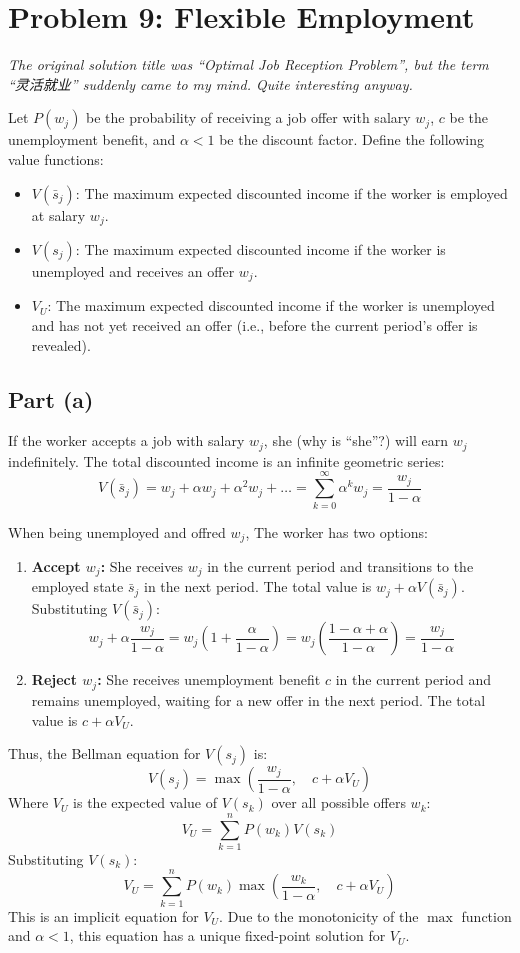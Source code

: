 \documentclass[11pt, a4paper, oneside]{memoir}
\begin{document}
\chapter{Problem 9: Flexible Employment}
\textit{The original solution title was ``Optimal Job Reception Problem'', but the term ``灵活就业'' suddenly came to my mind. Quite interesting anyway.}

Let $P(w_j)$ be the probability of receiving a job offer with salary $w_j$, $c$ be the unemployment benefit,
and $\alpha < 1$ be the discount factor. Define the following value functions:
\begin{itemize}
  \item $V(\bar{s}_j)$: The maximum expected discounted income if the worker is employed at salary $w_j$.
  \item $V(s_j)$: The maximum expected discounted income if the worker is unemployed and receives an offer $w_j$.
  \item $V_U$: The maximum expected discounted income if the worker is unemployed and has not yet received an offer (i.e., before the current period's offer is revealed).
\end{itemize}

\section{Part (a)}
If the worker accepts a job with salary $w_j$, she (why is ``she''?) will earn $w_j$ indefinitely.
The total discounted income is an infinite geometric series:
\[ V(\bar{s}_j) = w_j + \alpha w_j + \alpha^2 w_j + \dots = \sum_{k=0}^\infty \alpha^k w_j = \frac{w_j}{1-\alpha} \]

When being unemployed and offred $w_j$, The worker has two options:
\begin{enumerate}
  \item \textbf{Accept $w_j$:} She receives $w_j$ in the current period and transitions to the employed state $\bar{s}_j$
        in the next period. The total value is $w_j + \alpha V(\bar{s}_j)$. Substituting $V(\bar{s}_j)$:
        \[ w_j + \alpha \frac{w_j}{1-\alpha} = w_j \left(1 + \frac{\alpha}{1-\alpha}\right) = w_j \left(\frac{1-\alpha+\alpha}{1-\alpha}\right) = \frac{w_j}{1-\alpha} \]
  \item \textbf{Reject $w_j$:} She receives unemployment benefit $c$ in the current period and remains unemployed,
        waiting for a new offer in the next period. The total value is $c + \alpha V_U$.
\end{enumerate}
Thus, the Bellman equation for $V(s_j)$ is:
\[ V(s_j) = \max \left( \frac{w_j}{1-\alpha}, \quad c + \alpha V_U \right) \]
Where $V_U$ is the expected value of $V(s_k)$ over all possible offers $w_k$:
\[ V_U = \sum_{k=1}^n P(w_k) V(s_k) \]
Substituting $V(s_k)$:
\[ V_U = \sum_{k=1}^n P(w_k) \max \left( \frac{w_k}{1-\alpha}, \quad c + \alpha V_U \right) \]
This is an implicit equation for $V_U$. Due to the monotonicity of the $\max$ function and $\alpha < 1$,
this equation has a unique fixed-point solution for $V_U$.
\end{document}
